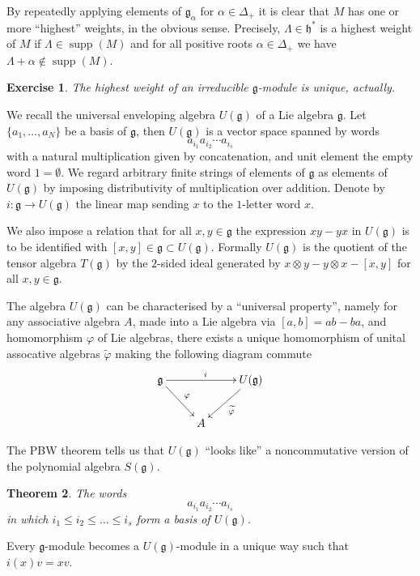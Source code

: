 \documentclass[12pt]{article}
\theoremstyle{plain}
\newtheorem{thm}{Theorem}[section]
\newtheorem{exer}[thm]{Exercise}
\theoremstyle{definition}
\numberwithin{equation}{section}
\DeclareMathOperator{\supp}{supp}
\newcommand{\al}{\alpha}
\newcommand{\La}{\Lambda}
\newcommand{\D}{\Delta}
\newcommand{\g}{\mathfrak{g}}
\newcommand{\h}{\mathfrak{h}}
\begin{document}
By repeatedly applying elements of $\g_\al$ for $\al \in \D_+$ it is clear that $M$ has one or more ``highest'' weights, in the obvious sense. Precisely, $\La \in \h^*$ is a highest weight of $M$ if $\La \in \supp(M)$ and for all positive roots $\al \in \D_+$ we have $\La + \al \notin \supp(M)$.
\begin{exer}
The highest weight of an irreducible $\g$-module is unique, actually.
\end{exer}


We recall the universal enveloping algebra $U(\g)$ of a Lie algebra $\g$. Let $\{a_1, \ldots, a_N\}$ be a basis of $\g$, then $U(\g)$ is a vector space spanned by words
\[
a_{i_1} a_{i_2} \cdots a_{i_s}
\]
with a natural multiplication given by concatenation, and unit element the empty word $1 = \emptyset$. We regard arbitrary finite strings of elements of $\g$ as elements of $U(\g)$ by imposing distributivity of multiplication over addition. Denote by $i : \g \rightarrow U(\g)$ the linear map sending $x$ to the $1$-letter word $x$.

We also impose a relation that for all $x, y \in \g$ the expression $x y - y x$ in $U(\g)$ is to be identified with $[x, y] \in \g \subset U(\g)$. Formally $U(\g)$ is the quotient of the tensor algebra $T(\g)$ by the $2$-sided ideal generated by $x \otimes y - y \otimes x - [x, y]$ for all $x, y \in \g$.

The algebra $U(\g)$ can be characterised by a ``universal property'', namely for any associative algebra $A$, made into a Lie algebra via $[a, b] = ab-ba$, and homomorphism $\varphi$ of Lie algebras, there exists a unique homomorphism of unital assocative algebras $\widetilde\varphi$ making the following diagram commute
\begin{align*}
\xymatrix{
\g \ar@{->}[dr]^{\varphi} \ar@{->}[rr]^i & & U(\g) \ar@{->}[dl]^{\widetilde\varphi} \\
%
& A & \\
}
\end{align*}

The PBW theorem tells us that $U(\g)$ ``looks like'' a noncommutative version of the polynomial algebra $S(\g)$.
\begin{thm}
The words
\[
a_{i_1} a_{i_2} \cdots a_{i_s}
\]
in which $i_1 \leq i_2 \leq \ldots \leq i_s$ form a basis of $U(\g)$.
\end{thm}

Every $\g$-module becomes a $U(\g)$-module in a unique way such that $i(x) v = xv$.
\end{document}

